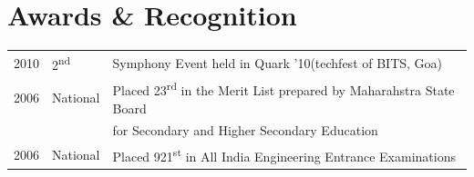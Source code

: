 \documentclass[letterpaper]{deedy-resume} %
\begin{document}
\begin{minipage}[t]{0.66\textwidth}
\sectionspace %


\section{Awards \& Recognition}

\begin{tabular}{rll}
2010 & 2\textsuperscript{nd} & Symphony Event held in Quark '10(techfest of BITS, Goa)\\
2006 & National & Placed 23\textsuperscript{rd} in the Merit List prepared by Maharahstra State Board\\
& & for Secondary and Higher Secondary Education\\
2006 & National & Placed 921\textsuperscript{st} in All India Engineering Entrance Examinations \\
\end{tabular}

\sectionspace %


\end{minipage} %
\end{document}
